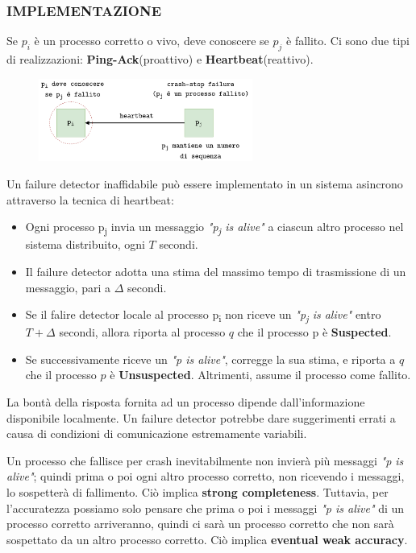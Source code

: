 \subsubsection{IMPLEMENTAZIONE}
Se $p_{i}$ è un processo corretto o vivo, deve conoscere se $p_{j}$ è fallito. Ci sono due tipi di realizzazioni: \textbf{Ping-Ack}(proattivo) e \textbf{Heartbeat}(reattivo).

\begin{figure}[ht]
    \centering
    \includegraphics[width=7cm]{./Images/cap2/2.19.png}
\end{figure}

Un failure detector inaffidabile può essere implementato in un sistema asincrono attraverso la tecnica di heartbeat:
\begin{itemize}
    \item Ogni processo p\textsubscript{j} invia un messaggio \textit{"p\textsubscript{j} is alive"} a ciascun altro processo nel sistema distribuito, ogni $T$ secondi.
    \item Il failure detector adotta una stima del massimo tempo di trasmissione di un messaggio, pari a $\Delta$ secondi.
    \item Se il falire detector locale al processo p\textsubscript{i} non riceve un \textit{"p\textsubscript{j} is alive"} entro $T + \Delta$ secondi, allora riporta al processo $q$ che il processo p è \textbf{Suspected}.
    \item Se successivamente riceve un \textit{"p is alive"}, corregge la sua stima, e riporta a $q$ che il processo $p$ è \textbf{Unsuspected}. Altrimenti, assume il processo come fallito.
\end{itemize}
La bontà della risposta fornita ad un processo dipende dall'informazione disponibile localmente. Un failure detector potrebbe dare suggerimenti errati a causa di condizioni di comunicazione estremamente variabili.

Un processo che fallisce per crash inevitabilmente non invierà più messaggi \textit{"p is alive"}; quindi prima o poi ogni altro processo corretto, non ricevendo i messaggi, lo sospetterà di fallimento. Ciò implica \textbf{strong completeness}. Tuttavia, per l'accuratezza possiamo solo pensare che prima o poi i messaggi \textit{"p is alive"} di un processo corretto arriveranno, quindi ci sarà un processo corretto che non sarà sospettato da un altro processo corretto. Ciò implica \textbf{eventual weak accuracy}.

